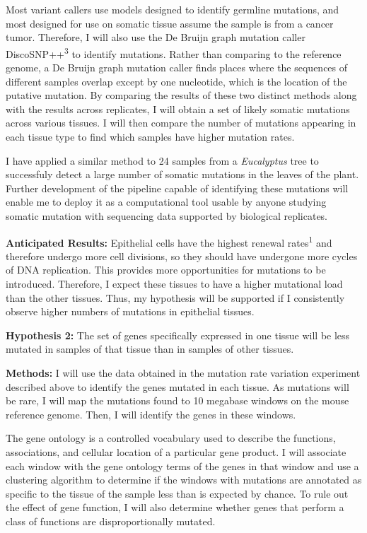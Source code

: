 \documentclass[12pt]{article}
\begin{document}
Most variant callers use models designed to identify germline mutations, and most designed for use on somatic tissue assume the sample is from a cancer tumor.
Therefore, I will also use the De Bruijn graph mutation caller DiscoSNP++\textsuperscript{3} to identify mutations.
Rather than comparing to the reference genome, a De Bruijn graph mutation caller finds places where the sequences of different samples overlap except by one nucleotide, which is the location of the putative mutation.
By comparing the results of these two distinct methods along with the results across replicates, I will obtain a set of likely somatic mutations across various tissues.
I will then compare the number of mutations appearing in each tissue type to find which samples have higher mutation rates.

I have applied a similar method to 24 samples from a \textit{Eucalyptus} tree to successfuly detect a large number of somatic mutations in the leaves of the plant. Further development of the pipeline capable of identifying these mutations will enable me to deploy it as a computational tool usable by anyone studying somatic mutation with sequencing data supported by biological replicates.

\textbf{Anticipated Results:}
Epithelial cells have the highest renewal rates\textsuperscript{1} and therefore undergo more cell divisions, so they should have undergone more cycles of DNA replication.
This provides more opportunities for mutations to be introduced.
Therefore, I expect these tissues to have a higher mutational load than the other tissues.
Thus, my hypothesis will be supported if I consistently observe higher numbers of mutations in epithelial tissues.

\textbf{Hypothesis 2:}
The set of genes specifically expressed in one tissue will be less mutated in samples of that tissue than in samples of other tissues.

\textbf{Methods:}
I will use the data obtained in the mutation rate variation experiment described above to identify the genes mutated in each tissue.
As mutations will be rare, I will map the mutations found to 10 megabase windows on the mouse reference genome.
Then, I will identify the genes in these windows.

The gene ontology is a controlled vocabulary used to describe the functions, associations, and cellular location of a particular gene product.
I will associate each window with the gene ontology terms of the genes in that window and use a clustering algorithm to determine if the windows with mutations are annotated as specific to the tissue of the sample less than is expected by chance.
To rule out the effect of gene function, I will also determine whether genes that perform a class of functions are disproportionally mutated.
\end{document}

